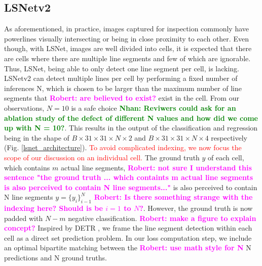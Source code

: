 \documentclass[journal]{IEEEtran}
\newcommand{\commentN}[1]{\textbf{\textcolor{green}{Nhan: #1}}}
\newcommand{\commentR}[1]{\textbf{\textcolor{magenta}{Robert: #1}}}
\begin{document}
\subsection{LSNetv2}
As aforementioned, in practice, images captured for inspection commonly have powerlines visually intersecting or being in close proximity to each other. Even though, with LSNet, images are well divided into cells, it is expected that there are cells where there are multiple line segments and few of which are ignorable. Thus, LSNet, being able to only detect one line segment per cell, is lacking. LSNetv2 can detect multiple lines per cell by performing a fixed number of inferences N, which is chosen to be larger than the maximum number of line segments that \commentR{are believed to exist?} exist in the cell. From our observations, $N=10$ is a safe choice \commentN{Reviwers could ask for an ablation study of the defect of different N values and how did we come up with N = 10?}. This results in the output of the classification and regression being in the shape of $B \times 31 \times 31 \times N \times 2$ and $B \times 31 \times 31 \times N \times 4$ respectively (Fig. \ref{lsnet_architecture}). \textcolor{red}{To avoid complicated indexing, we now focus the scope of our discussion on an individual cell.} The ground truth $y$ of each cell, which contains $m$ actual line segments, \commentR{not sure I understand this sentence "the ground truth ... which containts m actual line segments is also perceived to contain N line segments..."} is also perceived to contain N line segments $y=\{y_i\}^N_{i-1}$ \commentR{Is there something strange with the indexing here? Should is be $i=1$ to $N$?}. However, the ground truth is now padded with $N-m$ negative classification. \commentR{make a figure to explain concept?} Inspired by DETR \cite{DETR}, we frame the line segment detection within each cell as a direct set prediction problem. In our loss computation step, we include an optimal bipartite matching between the \commentR{use math style for N} N predictions and N ground truths.
\end{document}

